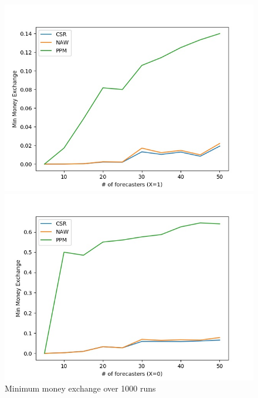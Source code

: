 \documentclass[english,10pt]{article}
\begin{document}
\begin{enumerate}
\begin{enumerate}
        	\begin{figure}[H]
        	\centering
        	\begin{minipage}{0.48\textwidth}
        	\includegraphics[width = \textwidth]{(Beta_1_0dot2)Min_MnEx(X=1).jpg}
        	\end{minipage}
        	\begin{minipage}{0.48\textwidth}
        	\includegraphics[width = \textwidth]{(Beta_1_0dot2)Min_MnEx(X=0).jpg}
        	\end{minipage}
        	\caption{Minimum money exchange over 1000 runs}
        	\end{figure}
	

\end{enumerate}
\end{enumerate}
\end{document}
